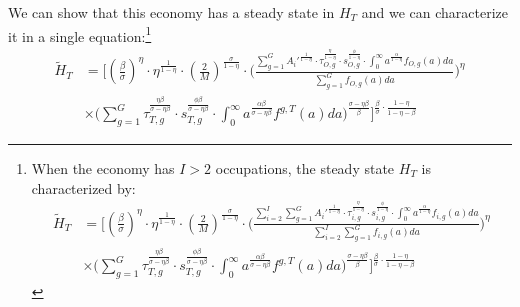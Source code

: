 \documentclass[onehalfspacing,11pt]{article}
\begin{document}
We can show that this economy has a steady state in $H_T$ and we can characterize it in a single equation:\footnote{When the economy has $I>2$ occupations, the steady state $H_T$ is characterized by:
\begin{align*}
\widetilde{H}_{T} & = \Bigg[ \left(\tfrac{\beta}{\sigma}\right)^\eta \cdot\eta^{\frac{1}{1-\eta}} \cdot \left(\tfrac{2}{M}\right)^{\frac{\sigma}{1-\eta}} \cdot \Bigg( \frac{\sum_{i=2}^I \sum_{g=1}^G {A_i'}^\frac{1}{1-\eta}\cdot\tau_{i,g}^\frac{\eta}{1-\eta} \cdot s_{i,g}^\frac{\phi}{1-\eta}\cdot \int_0^\infty a^{\frac{\alpha}{1-\eta}} f_{i,g}(a)da}{\sum_{i=2}^I \sum_{g=1}^G f_{i,g}(a)da} \Bigg)^\eta \nonumber\\
& \times \Bigg(\sum_{g=1}^G \tau_{T,g}^\frac{\eta\beta }{\sigma-\eta\beta } \cdot s_{T,g}^\frac{\phi\beta }{\sigma-\eta\beta } \cdot \int_0^\infty a^\frac{\alpha\beta}{\sigma-\eta\beta } f^{g,T}(a)da \Bigg)^\frac{\sigma-\eta\beta}{\beta} \Bigg]^{\frac{\beta}{\sigma}\cdot\frac{1-\eta}{1-\eta-\beta}}
\end{align*}
}
\begin{align}
\widetilde{H}_{T} & = \Bigg[ \left(\tfrac{\beta}{\sigma}\right)^\eta \cdot\eta^{\frac{1}{1-\eta}} \cdot \left(\tfrac{2}{M}\right)^{\frac{\sigma}{1-\eta}} \cdot \Bigg( \frac{\sum_{g=1}^G {A_i'}^\frac{1}{1-\eta}\cdot\tau_{O,g}^\frac{\eta}{1-\eta} \cdot s_{O,g}^\frac{\phi}{1-\eta}\cdot \int_0^\infty a^{\frac{\alpha}{1-\eta}} f_{O,g}(a)da}{\sum_{g=1}^G f_{O,g}(a)da} \Bigg)^\eta \nonumber\\
& \times \Bigg(\sum_{g=1}^G \tau_{T,g}^\frac{\eta\beta }{\sigma-\eta\beta } \cdot s_{T,g}^\frac{\phi\beta }{\sigma-\eta\beta } \cdot \int_0^\infty a^\frac{\alpha\beta}{\sigma-\eta\beta } f^{g,T}(a)da \Bigg)^\frac{\sigma-\eta\beta}{\beta} \Bigg]^{\frac{\beta}{\sigma}\cdot\frac{1-\eta}{1-\eta-\beta}}
\end{align}
\end{document}
